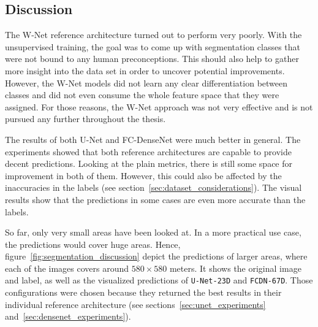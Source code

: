 \subsection{Discussion}
\label{sec:segmentation_discussion}
The W-Net reference architecture turned out to perform very poorly. With the unsupervised training, the goal was to come up with segmentation classes that were not bound to any human preconceptions. This should also help to gather more insight into the data set in order to uncover potential improvements. However, the W-Net models did not learn any clear differentiation between classes and did not even consume the whole feature space that they were assigned. For those reasons, the W-Net approach was not very effective and is not pursued any further throughout the thesis.

The results of both U-Net and FC-DenseNet were much better in general. The experiments showed that both reference architectures are capable to provide decent predictions. Looking at the plain metrics, there is still some space for improvement in both of them. However, this could also be affected by the inaccuracies in the labels (see section~\ref{sec:dataset_considerations}). The visual results show that the predictions in some cases are even more accurate than the labels.

So far, only very small areas have been looked at. In a more practical use case, the predictions would cover huge areas. Hence, figure~\ref{fig:segmentation_discussion} depict the predictions of larger areas, where each of the images covers around $580\times 580$ meters. It shows the original image and label, as well as the visualized predictions of \texttt{U-Net-23D} and \texttt{FCDN-67D}. Those configurations were chosen because they returned the best results in their individual reference architecture (see sections~\ref{sec:unet_experiments} and~\ref{sec:densenet_experiments}).


